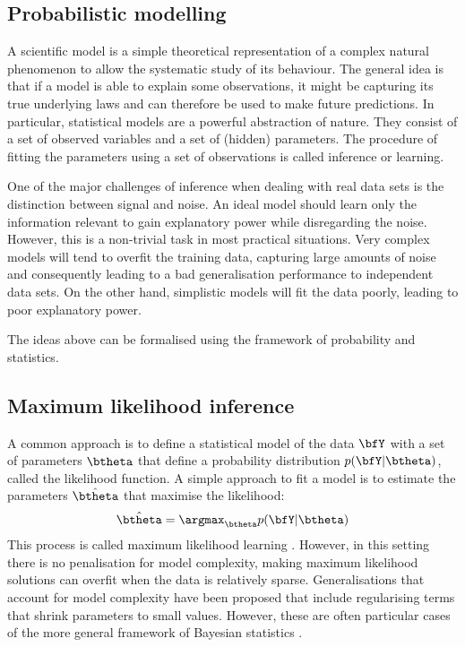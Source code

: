 \subsection{Probabilistic modelling} \label{section:probabilistic_modelling}

A scientific model is a simple theoretical representation of a complex natural phenomenon to allow the systematic study of its behaviour. The general idea is that if a model is able to explain some observations, it might be capturing its true underlying laws and can therefore be used to make future predictions.
In particular, statistical models are a powerful abstraction of nature. They consist of a set of observed variables and a set of (hidden) parameters. The procedure of fitting the parameters using a set of observations is called inference or learning.

One of the major challenges of inference when dealing with real data sets is the distinction between signal and noise. An ideal model should learn only the information relevant to gain explanatory power while disregarding the noise. However, this is a non-trivial task in most practical situations. Very complex models will tend to overfit the training data, capturing large amounts of noise and consequently leading to a bad generalisation performance to independent data sets. On the other hand, simplistic models will fit the data poorly, leading to poor explanatory power.

The ideas above can be formalised using the framework of probability and statistics.

\subsection{Maximum likelihood inference} \label{section:maximum_likelihood}

A common approach is to define a statistical model of the data $\bfY$ with a set of parameters $\btheta$ that define a probability distribution $p(\bfY|\btheta)$, called the likelihood function. A simple approach to fit a model is to estimate the parameters $\hat{\btheta}$ that maximise the likelihood:
\[
	\hat{\btheta} = \argmax_{\btheta} p(\bfY|\btheta)
\]
This process is called maximum likelihood learning \cite{Stigler2008,Bishop2006,Murphy}. However, in this setting there is no penalisation for model complexity, making maximum likelihood solutions can overfit when the data is relatively sparse. Generalisations that account for model complexity have been proposed that include regularising terms that shrink parameters to small values. However, these are often particular cases of the more general framework of Bayesian statistics \cite{Hastie,Bishop2006,Murphy}.

